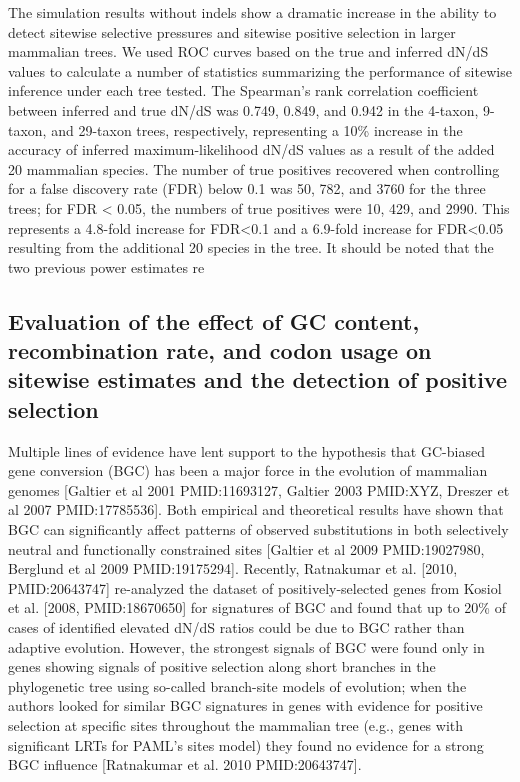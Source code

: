 The simulation results without indels show a dramatic increase in the
ability to detect sitewise selective pressures and sitewise positive
selection in larger mammalian trees. We used ROC curves based on the
true and inferred dN/dS values to calculate a number of statistics
summarizing the performance of sitewise inference under each tree
tested. The Spearman’s rank correlation coefficient between inferred
and true dN/dS was 0.749, 0.849, and 0.942 in the 4-taxon, 9-taxon,
and 29-taxon trees, respectively, representing a 10\% increase in the
accuracy of inferred maximum-likelihood dN/dS values as a result of
the added 20 mammalian species. The number of true positives recovered
when controlling for a false discovery rate (FDR) below 0.1 was 50,
782, and 3760 for the three trees; for FDR < 0.05, the numbers of true
positives were 10, 429, and 2990. This represents a 4.8-fold increase
for FDR<0.1 and a 6.9-fold increase for FDR<0.05 resulting from the
additional 20 species in the tree. It should be noted that the two
previous power estimates re

\subsection{Evaluation of the effect of GC content, recombination rate, and codon usage on sitewise \dnds estimates and the detection of positive selection}

Multiple lines of evidence have lent support to the hypothesis that
GC-biased gene conversion (BGC) has been a major force in the
evolution of mammalian genomes [Galtier et al 2001 PMID:11693127,
  Galtier 2003 PMID:XYZ, Dreszer et al 2007 PMID:17785536]. Both
empirical and theoretical results have shown that BGC can
significantly affect patterns of observed substitutions in both
selectively neutral and functionally constrained sites [Galtier et al
  2009 PMID:19027980, Berglund et al 2009 PMID:19175294]. Recently,
Ratnakumar et al. [2010, PMID:20643747] re-analyzed the dataset of
positively-selected genes from Kosiol et al. [2008, PMID:18670650] for
signatures of BGC and found that up to 20\% of cases of identified
elevated dN/dS ratios could be due to BGC rather than adaptive
evolution. However, the strongest signals of BGC were found only in
genes showing signals of positive selection along short branches in
the phylogenetic tree using so-called branch-site models of evolution;
when the authors looked for similar BGC signatures in genes with
evidence for positive selection at specific sites throughout the
mammalian tree (e.g., genes with significant LRTs for PAML’s sites
model) they found no evidence for a strong BGC influence [Ratnakumar
  et al. 2010 PMID:20643747].


